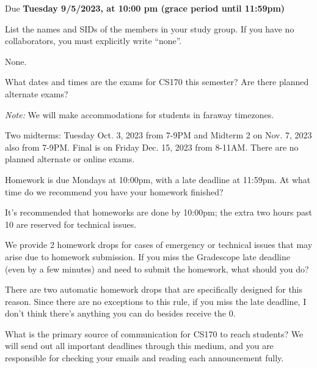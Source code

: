 \documentclass[11pt]{article}
\def\duedate{Tuesday 9/5/2023, at 10:00 pm (grace period until 11:59pm)}
\begin{document}
\maketitle
Due \textbf{\duedate}

List the names and SIDs of the members in your study group.
If you have no collaborators, you must explicitly write ``none''.

\begin{solution}
None.
\end{solution}


\begin{subparts}
\subpart What dates and times are the exams for CS170 this semester? Are there planned alternate exams?

\textit{Note:} We will make accommodations for students in faraway timezones.

\begin{solution}
	Two midterms: Tuesday Oct. 3, 2023 from 7-9PM and Midterm 2 on Nov. 7, 2023 also from 7-9PM. Final is 
	on Friday Dec. 15, 2023 from 8-11AM. There are no planned alternate or online exams.
\end{solution}

\subpart Homework is due Mondays at 10:00pm, with a late deadline at 11:59pm. At what time do we recommend you have your homework finished?

\begin{solution}
	It's recommended that homeworks are done by 10:00pm; the extra two hours past 10 are reserved
	for technical issues. 
\end{solution}
\subpart We provide 2 homework drops for cases of emergency or technical issues that may arise due to homework submission. 
If you miss the Gradescope late deadline (even by a few minutes) and need to submit the homework, what should you do?

\begin{solution}
	There are two automatic homework drops that are specifically designed for this reason. Since there are no 
	exceptions to this rule, if you miss the late deadline, I don't think there's anything you can do besides
	receive the 0. 
\end{solution}
\subpart What is the primary source of communication for CS170 to reach students? 
We will send out all important deadlines through this medium, and you are responsible for checking your emails and reading each announcement fully.


\end{subparts}
\end{document}
